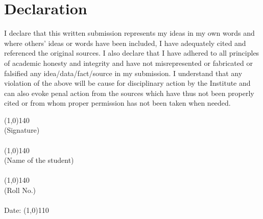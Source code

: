 \section*{ \center Declaration}
\vspace{1cm}
\hspace{0.2in}I declare that this written submission represents my ideas in my own words and where others' ideas
or words have been included, I have adequately cited and referenced the original sources. I also
declare that I have adhered to all principles of academic honesty and integrity and have not
misrepresented or fabricated or falsified any idea/data/fact/source in my submission. I understand
that any violation of the above will be cause for disciplinary action by the Institute and can also evoke
penal action from the sources which have thus not been properly cited or from whom proper
permission has not been taken when needed. 


\vspace{6cm}
\line(1,0){140}\\
(Signature) \\
\vspace{0.1cm}\\
\line(1,0){140}\\
(Name of the student) \\
\vspace{0.1cm}\\
\line(1,0){140}\\
(Roll No.) \\
\vspace{0.1cm}\\
Date: \line(1,0){110}